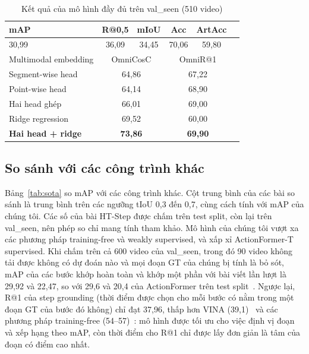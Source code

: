 \documentclass{IEEEtran}
\begin{document}
\begin{table}[t]
\caption{Kết quả của mô hình đầy đủ trên val\_seen (510 video)}
\label{tab:main}
\centering
\setlength{\tabcolsep}{4pt}
\begin{tabular}{|l|c|c|c|c|c|}
\hline
mAP & R@0,5 & mIoU & Acc & ArtAcc & \\
\hline
30,99 & 36,09 & 34,45 & 70,06 & 59,80 & \\
\hline
\hline
Multimodal embedding & \multicolumn{2}{c|}{OmniCosC} & \multicolumn{2}{c|}{OmniR@1} & \\
\hline
Segment-wise head & \multicolumn{2}{c|}{64,86} & \multicolumn{2}{c|}{67,22} & \\
Point-wise head & \multicolumn{2}{c|}{64,14} & \multicolumn{2}{c|}{68,90} & \\
Hai head ghép & \multicolumn{2}{c|}{66,01} & \multicolumn{2}{c|}{69,00} & \\
Ridge regression & \multicolumn{2}{c|}{69,52} & \multicolumn{2}{c|}{60,00} & \\
\textbf{Hai head + ridge} & \multicolumn{2}{c|}{\textbf{73,86}} & \multicolumn{2}{c|}{\textbf{69,90}} & \\
\hline
\end{tabular}
\end{table}

\subsection{So sánh với các công trình khác}
Bảng~\ref{tab:sota} so mAP với các công trình khác. Cột trung bình của các bài so sánh là trung bình trên các ngưỡng tIoU 0,3 đến 0,7, cùng cách tính với mAP của chúng tôi. Các số của bài HT-Step được chấm trên test split, còn lại trên val\_seen, nên phép so chỉ mang tính tham khảo. Mô hình của chúng tôi vượt xa các phương pháp training-free và weakly supervised, và xấp xỉ ActionFormer-T supervised. Khi chấm trên cả 600 video của val\_seen, trong đó 90 video không tải được không có dự đoán nào và mọi đoạn GT của chúng bị tính là bỏ sót, mAP của các bước khớp hoàn toàn và khớp một phần với bài viết lần lượt là 29,92 và 22,47, so với 29,6 và 20,4 của ActionFormer trên test split~\cite{htstep}. Ngược lại, R@1 của step grounding (thời điểm được chọn cho mỗi bước có nằm trong một đoạn GT của bước đó không) chỉ đạt 37,96, thấp hơn VINA (39,1)~\cite{vina} và các phương pháp training-free (54--57)~\cite{baglm,hsd}: mô hình được tối ưu cho việc định vị đoạn và xếp hạng theo mAP, còn thời điểm cho R@1 chỉ được lấy đơn giản là tâm của đoạn có điểm cao nhất.
\end{document}
